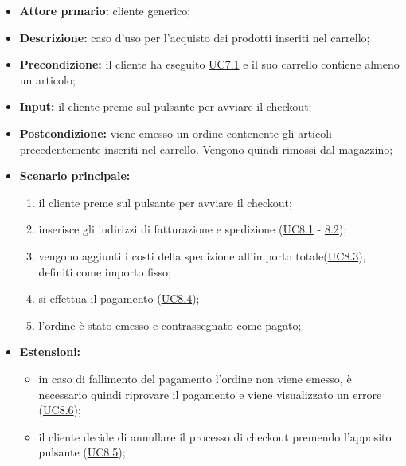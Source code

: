 \begin{itemize}
    \item \textbf{Attore prmario:} cliente generico;
    \item \textbf{Descrizione:} caso d'uso per l'acquisto dei prodotti inseriti nel carrello;
    \item \textbf{Precondizione:} il cliente ha eseguito \hyperref[UC7.1]{UC7.1} e il suo carrello contiene almeno un articolo;
    \item \textbf{Input:} il cliente preme sul pulsante per avviare il checkout;
    \item \textbf{Postcondizione:} viene emesso un ordine contenente gli articoli precedentemente inseriti nel carrello. Vengono quindi rimossi dal magazzino;
    \item \textbf{Scenario principale:}
          \begin{enumerate}
              \item il cliente preme sul pulsante per avviare il checkout;
              \item inserisce gli indirizzi di fatturazione e spedizione (\hyperref[UC8.1]{UC8.1} - \hyperref[UC8.2]{8.2});
              \item vengono aggiunti i costi della spedizione all'importo totale(\hyperref[UC8.3]{UC8.3}), definiti come importo fisso;
              \item si effettua il pagamento (\hyperref[UC8.4]{UC8.4});
              \item l'ordine è stato emesso e contrassegnato come pagato;
          \end{enumerate}
    \item \textbf{Estensioni:}
          \begin{itemize}
              \item in caso di fallimento del pagamento l'ordine non viene emesso, è necessario quindi riprovare il pagamento e viene visualizzato un errore (\hyperref[UC8.6]{UC8.6});
              \item il cliente decide di annullare il processo di checkout premendo l'apposito pulsante (\hyperref[UC8.5]{UC8.5});
          \end{itemize}
\end{itemize}

\stepsubUserCase
